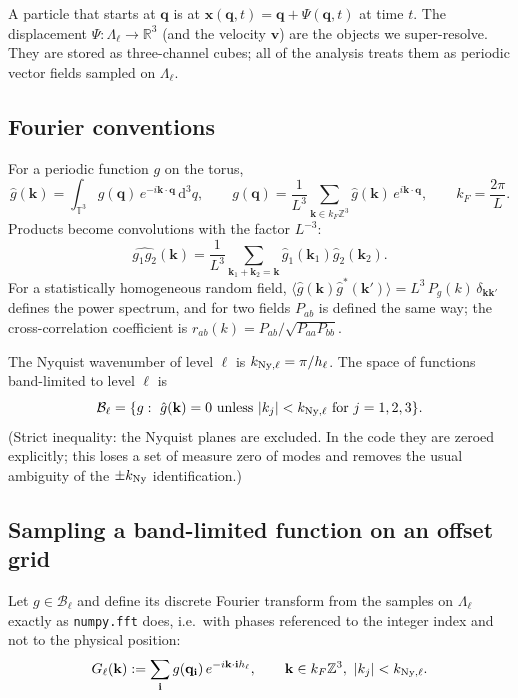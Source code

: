 \documentclass[11pt]{article}
\theoremstyle{definition}
\newcommand{\q}{\mathbf{q}}
\newcommand{\x}{\mathbf{x}}
\newcommand{\kk}{\mathbf{k}}
\newcommand{\R}{\mathbb{R}}
\newcommand{\Z}{\mathbb{Z}}
\newcommand{\dd}{\mathrm{d}}
\newcommand{\Ny}{{\rm Ny}}
\begin{document}
A particle that starts at $\q$ is at $\x(\q,t)=\q+\Psi(\q,t)$ at time $t$. The displacement $\Psi:\Lambda_\ell\to\R^3$ (and the velocity $\mathbf v$) are the objects we super-resolve. They are stored as three-channel cubes; all of the analysis treats them as periodic vector fields sampled on $\Lambda_\ell$.

\subsection{Fourier conventions}

For a periodic function $g$ on the torus,
\begin{equation}
\hat g(\kk)=\int_{\mathbb T^3} g(\q)\,e^{-i\kk\cdot\q}\,\dd^3q,\qquad g(\q)=\frac{1}{L^3}\sum_{\kk\in k_F\Z^3}\hat g(\kk)\,e^{i\kk\cdot\q},\qquad k_F=\frac{2\pi}{L}.
\label{eq:fourier}
\end{equation}
Products become convolutions with the factor $L^{-3}$:
\begin{equation}
\widehat{g_1g_2}(\kk)=\frac{1}{L^3}\sum_{\kk_1+\kk_2=\kk}\hat g_1(\kk_1)\hat g_2(\kk_2).
\label{eq:conv}
\end{equation}
For a statistically homogeneous random field, $\langle\hat g(\kk)\hat g^*(\kk')\rangle=L^3\,P_g(k)\,\delta_{\kk\kk'}$ defines the power spectrum, and for two fields $P_{ab}$ is defined the same way; the cross-correlation coefficient is $r_{ab}(k)=P_{ab}/\sqrt{P_{aa}P_{bb}}$.

The Nyquist wavenumber of level $\ell$ is $k_{\Ny,\ell}=\pi/h_\ell$. The space of functions band-limited to level $\ell$ is
\begin{equation}
\mathcal B_\ell=\{g:\ \hat g(\kk)=0\ \text{unless}\ |k_j|<k_{\Ny,\ell}\ \text{for } j=1,2,3\}.
\end{equation}
(Strict inequality: the Nyquist planes are excluded. In the code they are zeroed explicitly; this loses a set of measure zero of modes and removes the usual ambiguity of the $\pm k_\Ny$ identification.)

\subsection{Sampling a band-limited function on an offset grid}

Let $g\in\mathcal B_\ell$ and define its discrete Fourier transform from the samples on $\Lambda_\ell$ exactly as \texttt{numpy.fft} does, i.e.\ with phases referenced to the integer index and not to the physical position:
\begin{equation}
G_\ell(\kk):=\sum_{\mathbf i}g(\q_{\mathbf i})\,e^{-i\kk\cdot\mathbf i h_\ell},\qquad \kk\in k_F\Z^3,\ |k_j|<k_{\Ny,\ell}.
\end{equation}
\end{document}

